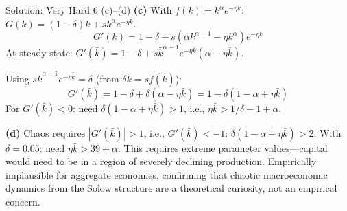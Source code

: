 \documentclass[aspectratio=169,10pt]{beamer}
\newcommand{\backbutton}[1]{\hfill\hyperlink{#1}{\beamerbutton{Back}}}
\begin{document}
\begin{frame}{Solution: Very Hard 6 (c)--(d)}
\textbf{(c)} With $f(k)=k^\alpha e^{-\eta k}$: $G(k)=(1-\delta)k+sk^\alpha e^{-\eta k}$.
\[
G'(k) = 1-\delta+s(\alpha k^{\alpha-1}-\eta k^\alpha)e^{-\eta k}
\]
At steady state: $G'(\bar{k}) = 1-\delta+s\bar{k}^{\alpha-1}e^{-\eta\bar{k}}(\alpha-\eta\bar{k})$.

Using $s\bar{k}^{\alpha-1}e^{-\eta\bar{k}} = \delta$ (from $\delta\bar{k}=sf(\bar{k})$):
\[
G'(\bar{k}) = 1-\delta+\delta(\alpha-\eta\bar{k}) = 1-\delta(1-\alpha+\eta\bar{k})
\]
For $G'(\bar{k})<0$: need $\delta(1-\alpha+\eta\bar{k})>1$, i.e., $\eta\bar{k} > 1/\delta-1+\alpha$.

\medskip
\textbf{(d)} Chaos requires $|G'(\bar{k})|>1$, i.e., $G'(\bar{k})<-1$: $\delta(1-\alpha+\eta\bar{k})>2$. With $\delta=0.05$: need $\eta\bar{k}>39+\alpha$. This requires extreme parameter values---capital would need to be in a region of severely declining production. Empirically implausible for aggregate economies, confirming that chaotic macroeconomic dynamics from the Solow structure are a theoretical curiosity, not an empirical concern.
\backbutton{q-v6}
\end{frame}
\end{document}
